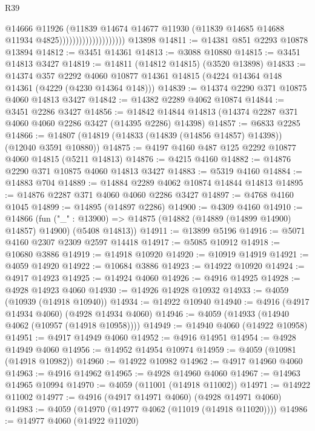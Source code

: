 \begin{lexlean}{R39}
\begin{coremodule}
                                        @14666
                                        @11926
                                        (@11839
                                          @14674
                                          @14677
                                          @11930
                                          (@11839 @14685 @14688 @11934 @4825))))))))))))))))))))
    @13898
@14811 := @14381 @851 @2293 @10878 @13894
@14812 := @3451 @14361
@14813 := @3088 @10880
@14815 := @3451 @14813 @3427
@14819 := @14811 (@14812 @14815) (@3520 @13898)
@14833 := @14374
    @357
    @2292
    @4060
    @10877
    @14361
    @14815
    (@4224 @14364 @148 @14361 (@4229 (@4230 @14364 @148)))
@14839 := @14374 @2290 @371 @10875 @4060 @14813 @3427
@14842 := @14382 @2289 @4062 @10874
@14844 := @3451 @2286 @3427
@14856 := @14842 @14844 @14813 (@14374 @2287 @371 @4060 @4060 @2286 @3427 (@14395 @2286) @14398)
@14857 := @6833 @2285
@14866 := @14807 (@14819 (@14833 (@14839 (@14856 @14857) @14398)) (@12040 @3591 @10880))
@14875 := @4197 @4160 @487 @125 @2292 @10877 @4060 @14815 (@5211 @14813)
@14876 := @4215 @4160
@14882 := @14876 @2290 @371 @10875 @4060 @14813 @3427
@14883 := @5319 @4160
@14884 := @14883 @704
@14889 := @14884 @2289 @4062 @10874 @14844 @14813
@14895 := @14876 @2287 @371 @4060 @4060 @2286 @3427
@14897 := @4768 @4160 @1045
@14899 := @14895 (@14897 @2286)
@14900 := @4309 @4160
@14910 := @14866
    (fun ("_" : @13900) => @14875 (@14882 (@14889 (@14899 @14900) @14857) @14900) (@5408 @14813))
@14911 := @13899 @5196
@14916 := @5071 @4160 @2307 @2309 @2597 @14418
@14917 := @5085 @10912
@14918 := @10680 @3886
@14919 := @14918 @10920
@14920 := @10919 @14919
@14921 := @4059 @14920
@14922 := @10684 @3886
@14923 := @14922 @10920
@14924 := @4917 @14923
@14925 := @14924 @4060
@14926 := @4916 @14925
@14928 := @4928 @14923 @4060
@14930 := @14926 @14928 @10932
@14933 := @4059 (@10939 (@14918 @10940))
@14934 := @14922 @10940
@14940 := @4916 (@4917 @14934 @4060) (@4928 @14934 @4060)
@14946 := @4059 (@14933 (@14940 @4062 (@10957 (@14918 @10958))))
@14949 := @14940 @4060 (@14922 @10958)
@14951 := @4917 @14949 @4060
@14952 := @4916 @14951
@14954 := @4928 @14949 @4060
@14956 := @14952 @14954 @10974
@14959 := @4059 (@10981 (@14918 @10982))
@14960 := @14922 @10982
@14962 := @4917 @14960 @4060
@14963 := @4916 @14962
@14965 := @4928 @14960 @4060
@14967 := @14963 @14965 @10994
@14970 := @4059 (@11001 (@14918 @11002))
@14971 := @14922 @11002
@14977 := @4916 (@4917 @14971 @4060) (@4928 @14971 @4060)
@14983 := @4059 (@14970 (@14977 @4062 (@11019 (@14918 @11020))))
@14986 := @14977 @4060 (@14922 @11020)

\end{coremodule}
\end{lexlean}
